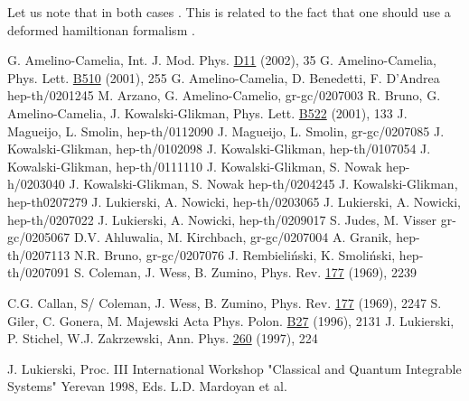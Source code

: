 \documentclass[a4paper,12pt]{article}
\begin{document}
Let us note that in both cases \coordHE{}. This is related to the fact that
one should use a deformed hamiltionan formalism \cite{b24}.

\begin{thebibliography}{99}
G. Amelino-Camelia, Int. J. Mod. Phys. \underline{D11} (2002), 35
G. Amelino-Camelia, Phys. Lett. \underline{B510} (2001), 255
G. Amelino-Camelia, D. Benedetti, F. D'Andrea hep-th/0201245
M. Arzano, G. Amelino-Camelio, gr-gc/0207003
R. Bruno, G. Amelino-Camelia, J. Kowalski-Glikman, Phys. Lett. \underline{B522} (2001), 133
J. Magueijo, L. Smolin, hep-th/0112090
J. Magueijo, L. Smolin, gr-gc/0207085
J. Kowalski-Glikman, hep-th/0102098
J. Kowalski-Glikman, hep-th/0107054
J. Kowalski-Glikman, hep-th/0111110
J. Kowalski-Glikman, S. Nowak hep-h/0203040
J. Kowalski-Glikman, S. Nowak hep-th/0204245
J. Kowalski-Glikman, hep-th0207279
J. Lukierski, A. Nowicki, hep-th/0203065
J. Lukierski, A. Nowicki, hep-th/0207022
J. Lukierski, A. Nowicki, hep-th/0209017
S. Judes, M. Visser gr-gc/0205067
D.V. Ahluwalia, M. Kirchbach, gr-gc/0207004
A. Granik, hep-th/0207113
N.R. Bruno, gr-gc/0207076
J. Rembieli\'nski, K. Smoli\'nski, hep-th/0207091
S. Coleman, J. Wess, B. Zumino, Phys. Rev. \underline{177} (1969), 2239

C.G. Callan, S/ Coleman, J. Wess, B. Zumino, Phys. Rev. \underline{177} (1969), 2247
S. Giler, C. Gonera, M. Majewski Acta Phys. Polon. \underline{B27} (1996), 2131
J. Lukierski, P. Stichel, W.J. Zakrzewski, Ann. Phys. \underline{260} (1997), 224

J. Lukierski, Proc. III International Workshop "Classical and Quantum Integrable Systems" Yerevan 1998, Eds. L.D.
 Mardoyan et al.
\end{thebibliography}
\end{document}
